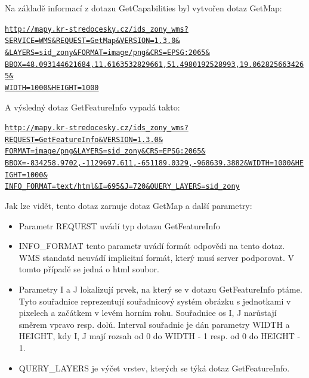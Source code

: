 \documentclass[a4paper,12pt]{article}
\begin{document}
Na základě informací z dotazu GetCapabilities byl vytvořen dotaz GetMap: 

\newcommand{\StredoceskygetMap}{http://mapy.kr-stredocesky.cz/ids_zony_wms?SERVICE=WMS&REQUEST=GetMap&VERSION=1.3.0&FORMAT=image/png&LAYERS=sid_zony&CRS=EPSG:2065&BBOX=-834258.9702,-1129697.611,-651189.0329,-968639.3882&WIDTH=1000&HEIGHT=1000}
\begin{alltt}\footnotesize
\href{\StredoceskygetMap}{http://mapy.kr-stredocesky.cz/ids\_zony\_wms?}
\href{\StredoceskygetMap}{SERVICE=WMS\&REQUEST=GetMap\&VERSION=1.3.0\&}
\href{\StredoceskygetMap}{&LAYERS=sid_zony\&FORMAT=image/png&CRS=EPSG:2065\&}
\href{\StredoceskygetMap}{BBOX=48.093144621684,11.6163532829661,51.4980192528993,19.0628256634265\&}
\href{\StredoceskygetMap}{WIDTH=1000\&HEIGHT=1000}
\end{alltt}

A výsledný dotaz GetFeatureInfo vypadá takto:
\newcommand{\StredoceskyGetFeatureInfo}{http://mapy.kr-stredocesky.cz/ids_zony_wms?REQUEST=GetFeatureInfo&VERSION=1.3.0&FORMAT=image/png&LAYERS=sid_zony&CRS=EPSG:2065&BBOX=-834258.9702,-1129697.611,-651189.0329,-968639.3882&WIDTH=1000&HEIGHT=1000&INFO_FORMAT=text/html&I=695&J=720&QUERY_LAYERS=sid_zony}
\begin{alltt}\footnotesize
\href{\StredoceskyGetFeatureInfo}{http://mapy.kr-stredocesky.cz/ids\_zony\_wms?}
\href{\StredoceskyGetFeatureInfo}{REQUEST=GetFeatureInfo\&VERSION=1.3.0\&}
\href{\StredoceskyGetFeatureInfo}{FORMAT=image/png\&LAYERS=sid\_zony\&CRS=EPSG:2065\&}
\href{\StredoceskyGetFeatureInfo}{BBOX=-834258.9702,-1129697.611,-651189.0329,-968639.3882\&WIDTH=1000\&HEIGHT=1000\&}
\href{\StredoceskyGetFeatureInfo}{INFO\_FORMAT=text/html\&I=695\&J=720\&QUERY\_LAYERS=sid\_zony}
\end{alltt}


Jak lze vidět, tento dotaz zarnuje dotaz GetMap a další parametry:
\begin{itemize}
  \item Parametr REQUEST uvádí typ dotazu GetFeatureInfo 
  \item INFO\_FORMAT tento parametr uvádí formát odpovědi na tento dotaz. WMS standatd neuvádí implicitní formát, který musí server podporovat. V tomto případě se jedná o html soubor. 
  \item Parametry I a J lokalizují prvek, na který se v dotazu GetFeatureInfo ptáme. Tyto souřadnice reprezentují souřadnicový systém obrázku s jednotkami v pixelech a začátkem v levém horním rohu. Souřadnice os I, J narůstají  
        směrem vpravo resp. dolů. Interval souřadnic je dán parametry WIDTH a HEIGHT, kdy I, J mají rozsah od 0 do WIDTH - 1 resp. od 0 do HEIGHT - 1.  
  \item QUERY\_LAYERS je výčet vrstev, kterých se týká dotaz GetFeatureInfo. 
\end{itemize}
\end{document}
